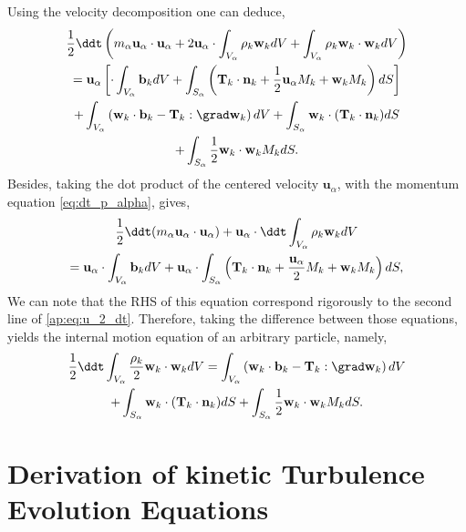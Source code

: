 Using the velocity decomposition one can deduce, 
\begin{multline}
    \frac{1}{2} \ddt \left(
        m_\alpha \textbf{u}_\alpha \cdot \textbf{u}_\alpha
        + 2\textbf{u}_\alpha \cdot \int_{V_\alpha}  \rho_k \textbf{w}_k dV
        + \int_{V_\alpha} \rho_k \textbf{w}_k \cdot \textbf{w}_k dV
    \right)\\
    =  \textbf{u}_\alpha \left[
        \cdot\int_{V_\alpha} \textbf{b}_k dV
        +  \int_{S_\alpha} \left(
            \textbf{T}_k \cdot \textbf{n}_k
            + \frac{1}{2} \textbf{u}_\alpha M_k 
            + \textbf{w}_k M_k 
        \right)dS
    \right]\\
    + \int_{V_\alpha} \left(
        \textbf{w}_k\cdot\textbf{b}_k
        -\textbf{T}_k : \grad \textbf{w}_k
    \right)dV
    + \int_{S_\alpha} 
        \textbf{w}_k\cdot(\textbf{T}_k\cdot \textbf{n}_k)
    dS\\
    + \int_{S_\alpha} \frac{1}{2} \textbf{w}_k \cdot \textbf{w}_k M_k dS.
    \label{ap:eq:u_2_dt}
\end{multline}
Besides, taking the dot product of the centered velocity $\textbf{u}_\alpha$, with the momentum equation \ref{eq:dt_p_alpha}, gives, 
\begin{multline*}
    \frac{1}{2}\ddt (m_\alpha \textbf{u}_\alpha \cdot \textbf{u}_\alpha)
    + \textbf{u}_\alpha \cdot \ddt \int_{V_\alpha} \rho_k \textbf{w}_k dV \\
    = \textbf{u}_\alpha \cdot \int_{V_\alpha} \textbf{b}_k dV
    + \textbf{u}_\alpha \cdot \int_{S_\alpha} \left(
    \textbf{T}_k \cdot\textbf{n}_k
    +\frac{\textbf{u}_\alpha}{2} M_k
    +\textbf{w}_k M_k
    \right)dS,
\end{multline*}
We can note that the RHS of this equation correspond rigorously to the second line of \ref{ap:eq:u_2_dt}.
Therefore, taking the difference between those equations, yields the internal motion equation of an arbitrary particle, namely, 
\begin{multline*}
    \frac{1}{2}\ddt \int_{V_\alpha} \frac{\rho_k}{2} \textbf{w}_k \cdot \textbf{w}_k dV
    = \int_{V_\alpha} \left(
        \textbf{w}_k\cdot\textbf{b}_k
        -\textbf{T}_k : \grad \textbf{w}_k
    \right)dV\\
    + \int_{S_\alpha} 
        \textbf{w}_k\cdot(\textbf{T}_k\cdot \textbf{n}_k)
    dS
    + \int_{S_\alpha} \frac{1}{2} \textbf{w}_k \cdot \textbf{w}_k M_k dS.
\end{multline*}

\section{Derivation of kinetic Turbulence Evolution Equations}

